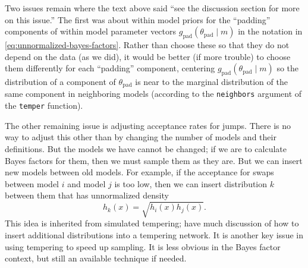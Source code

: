 \documentclass[11pt]{article}
\begin{document}
Two issues remain where the text above said ``see the discussion section for
more on this issue.''  The first was about within model priors for the
``padding'' components of within model parameter vectors
$g_{\text{pad}}(\theta_{\text{pad}} \mid m)$ in
the notation in \eqref{eq:unnormalized-bayes-factors}.
Rather than choose these so that they do not depend on the data (as we did),
it would be better (if more trouble) to choose them differently for each
``padding'' component, centering $g_{\text{pad}}(\theta_{\text{pad}} \mid m)$
so the distribution of a component of $\theta_{\text{pad}}$ is near to the
marginal distribution of the same component in neighboring models (according to
the \texttt{neighbors} argument of the \texttt{temper} function).

The other remaining issue is adjusting acceptance rates for jumps.  There
is no way to adjust this other than by changing the number of models and
their definitions.  But the models we have cannot be changed; if we are
to calculate Bayes factors for them, then we must sample them as they are.
But we can insert new models between old models.  For example,
if the acceptance for swaps between model $i$ and model $j$ is too low, then
we can insert distribution $k$ between them that has unnormalized density
$$
   h_k(x) = \sqrt{h_i(x) h_j(x)}.
$$
This idea is inherited from simulated tempering; \citep{geyer-thompson}
have much
discussion of how to insert additional distributions into a tempering network.
It is another key issue in using tempering to speed up sampling.  It is
less obvious in the Bayes factor context, but still an available technique
if needed.
\end{document}
